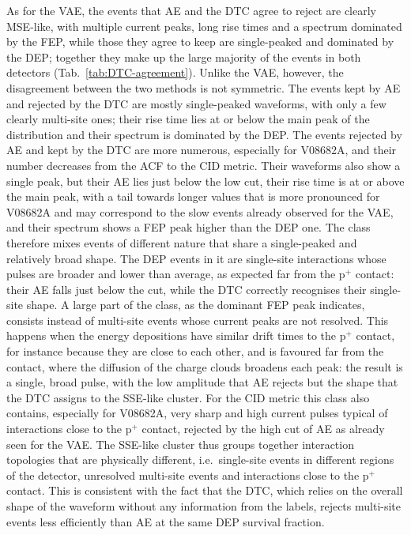 As for the \ac{VAE}, the events that \ac{AE} and the \ac{DTC} agree to reject are clearly \ac{MSE}-like, with multiple current peaks, long rise times and a spectrum dominated by the \ac{FEP}, while those they agree to keep are single-peaked and dominated by the \ac{DEP}; together they make up the large majority of the events in both detectors (Tab.~\ref{tab:DTC-agreement}). Unlike the \ac{VAE}, however, the disagreement between the two methods is not symmetric. The events kept by \ac{AE} and rejected by the \ac{DTC} are mostly single-peaked waveforms, with only a few clearly multi-site ones; their rise time lies at or below the main peak of the distribution and their spectrum is dominated by the \ac{DEP}. The events rejected by \ac{AE} and kept by the \ac{DTC} are more numerous, especially for V08682A, and their number decreases from the \ac{ACF} to the \ac{CID} metric. Their waveforms also show a single peak, but their \ac{AE} lies just below the low cut, their rise time is at or above the main peak, with a tail towards longer values that is more pronounced for V08682A and may correspond to the slow events already observed for the \ac{VAE}, and their spectrum shows a \ac{FEP} peak higher than the \ac{DEP} one. The class therefore mixes events of different nature that share a single-peaked and relatively broad shape. The \ac{DEP} events in it are single-site interactions whose pulses are broader and lower than average, as expected far from the p$^+$ contact: their \ac{AE} falls just below the cut, while the \ac{DTC} correctly recognises their single-site shape. A large part of the class, as the dominant \ac{FEP} peak indicates, consists instead of multi-site events whose current peaks are not resolved. This happens when the energy depositions have similar drift times to the p$^+$ contact, for instance because they are close to each other, and is favoured far from the contact, where the diffusion of the charge clouds broadens each peak: the result is a single, broad pulse, with the low amplitude that \ac{AE} rejects but the shape that the \ac{DTC} assigns to the \ac{SSE}-like cluster. For the \ac{CID} metric this class also contains, especially for V08682A, very sharp and high current pulses typical of interactions close to the p$^+$ contact, rejected by the high cut of \ac{AE} as already seen for the \ac{VAE}. The \ac{SSE}-like cluster thus groups together interaction topologies that are physically different, i.e.\ single-site events in different regions of the detector, unresolved multi-site events and interactions close to the p$^+$ contact. This is consistent with the fact that the \ac{DTC}, which relies on the overall shape of the waveform without any information from the labels, rejects multi-site events less efficiently than \ac{AE} at the same \ac{DEP} survival fraction.

